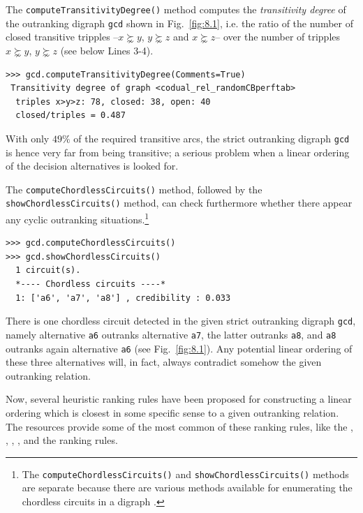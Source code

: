 The \texttt{computeTransitivityDegree()} method computes the \emph{transitivity degree} of the outranking digraph \texttt{gcd} shown in Fig.~\vref{fig:8.1}, i.e. the ratio of the number of closed transitive tripples --$x \succnsim y$, $y \succnsim z$ and $x \succnsim z$-- over the number of tripples $x \succnsim y$, $y \succnsim z$ (see below Lines 3-4).
\begin{lstlisting}
>>> gcd.computeTransitivityDegree(Comments=True)
 Transitivity degree of graph <codual_rel_randomCBperftab>
  triples x>y>z: 78, closed: 38, open: 40
  closed/triples = 0.487
\end{lstlisting}    

With only $49\%$ of the required transitive arcs, the strict outranking digraph \texttt{gcd} is hence very far from being transitive; a serious problem when a linear ordering of the decision alternatives is looked for.

The \texttt{computeChordlessCircuits()} method, followed by the \texttt{show\-Chord\-lessCircuits()} method, can check furthermore whether there appear any cyclic outranking situations.\footnote{The \texttt{computeChordlessCircuits()} and \texttt{showChordlessCircuits()} methods are separate because there are various methods available for enumerating the chordless circuits in a digraph \citep{BIS-2010}.}
\begin{lstlisting}
>>> gcd.computeChordlessCircuits()
>>> gcd.showChordlessCircuits()
  1 circuit(s).
  *---- Chordless circuits ----*    
  1: ['a6', 'a7', 'a8'] , credibility : 0.033
\end{lstlisting}

There is one chordless circuit detected in the given strict outranking digraph \texttt{gcd}, namely alternative \texttt{a6} outranks alternative \texttt{a7}, the latter outranks \texttt{a8}, and \texttt{a8} outranks again alternative \texttt{a6} (see Fig.~\vref{fig:8.1}). Any potential linear ordering of these three alternatives will, in fact, always contradict somehow the given outranking relation.

Now, several heuristic ranking rules have been proposed for constructing a linear ordering which is closest in some specific sense to a given outranking relation. The \Digraph resources provide some of the most common of these ranking rules, like the \Copeland, \Kemeny, \Slater, \Kohler, and the \RankedPairs ranking rules.

